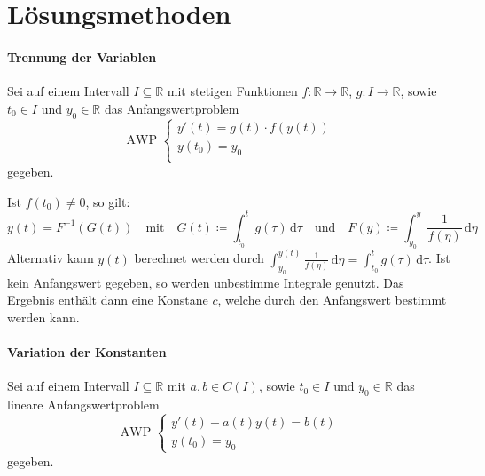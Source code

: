     \section{Lösungsmethoden}
        \paragraph{Trennung der Variablen}
            Sei auf einem Intervall $ I \subseteq \mathbb{R} $ mit stetigen Funktionen $ f : \mathbb{R} \rightarrow \mathbb{R} $, $ g : I \rightarrow \mathbb{R} $, sowie $ t _ 0 \in I $ und $ y _ 0 \in \mathbb{R} $ das Anfangswertproblem
            \begin{equation*}
                \text{AWP }
                \begin{cases}
                    y'(t) = g(t) \cdot f(y(t)) \\
                    y(t _ 0) = y _ 0 \\
                \end{cases}
            \end{equation*}
            gegeben.

            Ist $ f(t _ 0) \neq 0 $, so gilt:
            \begin{equation*}
                y(t) = F ^ { -1 } (G(t)) \quad\text{mit}\quad G(t) \coloneqq \int _ { t _ 0 } ^ t \! g(\tau) \, \mathrm{d}\tau \quad\text{und}\quad F(y) \coloneqq \int _ { y _ 0 } ^ y \! \frac{1}{f(\eta)} \, \mathrm{d}\eta
            \end{equation*}
            Alternativ kann $ y(t) $ berechnet werden durch $ \int _ { y _ 0 } ^ { y(t) } \! \frac{1}{f(\eta)} \, \mathrm{d}\eta = \int _ { t _ 0 } ^ { t } \! g(\tau) \, \mathrm{d}\tau $. Ist kein Anfangswert gegeben, so werden unbestimme Integrale genutzt. Das Ergebnis enthält dann eine Konstane $ c $, welche durch den Anfangswert bestimmt werden kann.

        \paragraph{Variation der Konstanten}
            Sei auf einem Intervall $ I \subseteq \mathbb{R} $ mit $ a, b \in C(I) $, sowie $ t _ 0 \in I $ und $ y _ 0 \in \mathbb{R} $ das lineare Anfangswertproblem
            \begin{equation*}
                \text{AWP }
                \begin{cases}
                    y'(t) + a(t)y(t) = b(t) \\
                    y(t _ 0) = y _ 0
                \end{cases}
            \end{equation*}
            gegeben.


